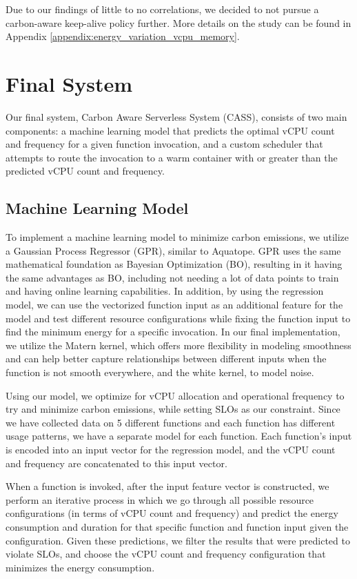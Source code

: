 \documentclass[times, 10pt,twocolumn]{article}
\begin{document}
Due to our findings of little to no correlations, we decided to not pursue a carbon-aware keep-alive policy further. More details on the study can be found in Appendix \ref{appendix:energy_variation_vcpu_memory}.

\section{Final System}

Our final system, Carbon Aware Serverless System (CASS), consists of two main components: a machine learning model that predicts the optimal vCPU count and frequency for a given function invocation, and a custom scheduler that attempts to route the invocation to a warm container with or greater than the predicted vCPU count and frequency.

\subsection{Machine Learning Model}
To implement a machine learning model to minimize carbon emissions, we utilize a Gaussian Process Regressor (GPR), similar to Aquatope\cite{aquatope}. GPR uses the same mathematical foundation as Bayesian Optimization (BO), resulting in it having the same advantages as BO, including not needing a lot of data points to train and having online learning capabilities. In addition, by using the regression model, we can use the vectorized function input as an additional feature for the model and test different resource configurations while fixing the function input to find the minimum energy for a specific invocation. In our final implementation, we utilize the Matern kernel, which offers more flexibility in modeling smoothness and can help better capture relationships between different inputs when the function is not smooth everywhere, and the white kernel, to model noise. 

Using our model, we optimize for vCPU allocation and operational frequency to try and minimize carbon emissions, while setting SLOs as our constraint. Since we have collected data on 5 different functions and each function has different usage patterns, we have a separate model for each function. Each function's input is encoded into an input vector for the regression model, and the vCPU count and frequency are concatenated to this input vector.

When a function is invoked, after the input feature vector is constructed, we perform an iterative process in which we go through all possible resource configurations (in terms of vCPU count and frequency) and predict the energy consumption and duration for that specific function and function input given the configuration. Given these predictions, we filter the results that were predicted to violate SLOs, and choose the vCPU count and frequency configuration that minimizes the energy consumption. 
\end{document}
